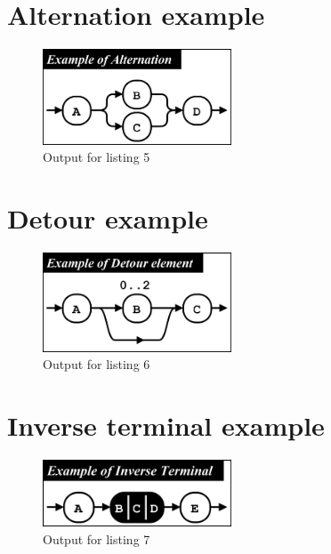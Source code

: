 \documentclass[12pt,a4paper]{article}
\begin{document}
\section{Alternation example}



\begin{figure}[h!]
\caption{Output for listing 5}
\centering
\includegraphics[width=0.5\textwidth]{results/ex06.png}
\end{figure}

\section{Detour example}



\begin{figure}[h!]
\caption{Output for listing 6}
\centering
\includegraphics[width=0.5\textwidth]{results/ex02.png}
\end{figure}

\section{Inverse terminal example}



\begin{figure}[h!]
\caption{Output for listing 7}
\centering
\includegraphics[width=0.5\textwidth]{results/ex04.png}
\end{figure}
\end{document}

